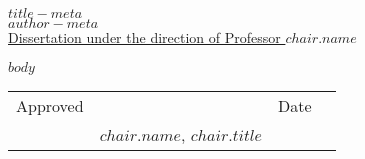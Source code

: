 \documentclass{article}
\begin{document}
\doublespacing
\begin{center}
    $title-meta$\\[1.5em]

    $author-meta$\\[1.5em]

\underline{Dissertation under the direction of Professor $chair.name$}
\end{center}

$body$

\begin{center}
\vfill
\begin{tabular}{@{}p{0.5in}p{3.25in}p{0.25in}p{1.25in}@{}}
    Approved & \hrulefill & Date & \hrulefill \\
             & $chair.name$, $chair.title$ & & \\
\end{tabular}
\end{center}
\end{document}
